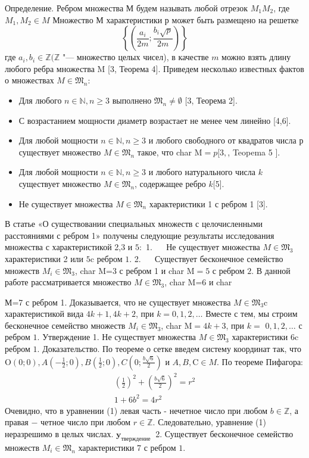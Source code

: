\documentclass[a4paper,openbib]{article}
\renewcommand{\geq}{\geqslant}
\begin{document}
Определение. Ребром множества М будем называть любой отрезок $M_{1} M_{2}$, где $M_{1}, M_{2} \in M$
Множество М характеристики р может быть размещено на решетке
$$
\left\{\left(\frac{a_{i}}{2 m} ; \frac{b_{i} \sqrt{p}}{2 m}\right)\right\}
$$
где $a_{i}, b_{i} \in \mathbb{Z}(\mathbb{Z}$ "--- множество целых чисел), в качестве $m$ можно взять длину любого ребра множества $\mathrm{M}$ [3, Теорема 4].
Приведем несколько известных фактов о множествах $M \in \mathfrak{M}_{n}:$
\begin{itemize}
	\item
		Для любого $n \in \mathbb{N}, n \geq 3$ выполнено $\mathfrak{M}_{n} \neq \emptyset$ [3, Теорема 2].
	\item
		С возрастанием мощности диаметр возрастает не менее чем линейно [4,6].
	\item
		Для любой мощности $n \in \mathbb{N}, n \geq 3$ и любого свободного от квадратов числа $р$ существует множество $M \in \mathfrak{M}_{n}$ такое, что char $\mathrm{M}={p}[3,$, Teopema 5 ].

	\item
		Для любой мощности $n \in \mathbb{N}, n \geq 3$ и любого натурального числа $k$ существует множество $M \in \mathfrak{M}_{n}$, содержащее ребро ${k}$[5].
	\item
		Не существует множества $M \in \mathfrak{M}_{n}$ характеристики 1 с ребром 1 [3].
\end{itemize}
В статье «О существовании специальных множеств с целочисленными расстояниями с ребром 1» получены следующие результаты исследования множества с характеристикой 2,3 и $5:$
1. $\quad$ Не существует множества $M \in \mathfrak{M}_{3}$ характеристики 2 или $5 \mathrm{c}$ ребром $1 .$
2. $\quad$ Существует бесконечное семейство множеств $M_{i} \in \mathfrak{M}_{3}$, char M=3
с ребром 1 и char $\mathrm{M}=5$ с ребром $2 .$ В данной работе рассматривается множество $M \in \mathfrak{M}_{3}$, char M=6 и char

М=7 с ребром 1. Доказывается, что не существует множества $M \in \mathfrak{M}_{3} \mathrm{c}$ характеристикой вида $4 k+1,4 k+2$, при $k=0,1,2, \ldots$ Вместе с тем, мы строим бесконечное семейство множеств $M_{i} \in \mathfrak{M}_{3}$, char $\mathrm{M}=4 k+3$, при $k=$ $0,1,2, \ldots$ с ребром $1 .$
Утверждение 1. Не существует множества $M \in \mathfrak{M}_{3}$ характеристики $6 \mathrm{c}$ ребром $1 .$ Доказательство. По теореме о сетке введем систему координат так, что $\mathrm{O}(0 ; 0), A\left(-\frac{1}{2} ; 0\right), B\left(\frac{1}{2} ; 0\right), C\left(0 ; \frac{b \sqrt{6}}{2}\right)$ и $A, B, \mathrm{C} \in M .$ По теореме
Пифагора:
$$
\begin{array}{c}
\left(\frac{1}{2}\right)^{2}+\left(\frac{b \sqrt{6}}{2}\right)^{2}=r^{2} \\
1+6 b^{2}=4 r^{2}
\end{array}
$$
Очевидно, что в уравнении (1) левая часть - нечетное число при любом $b \in \mathbb{Z}$, а правая $-$ четное число при любом $r \in \mathbb{Z} .$ Следовательно, уравнение
(1) неразрешимо в целых числах. $\mathbf{y}_{\text {тверждение }}$ 2. Существует бесконечное семейство множеств $M_{i} \in \mathfrak{M}_{n}$ характеристики 7 с ребром $1 .$
\end{document}
